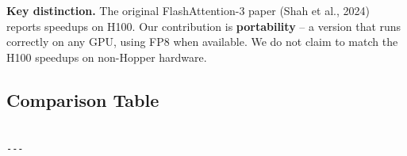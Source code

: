\textbf{Key distinction.} The original FlashAttention-3 paper (Shah et al., 2024) 
reports speedups on H100. Our contribution is \textbf{portability} -- a version 
that runs correctly on any GPU, using FP8 when available. We do not claim 
to match the H100 speedups on non-Hopper hardware.



\subsection{Comparison Table}

\begin{lstlisting}

---
\end{lstlisting}